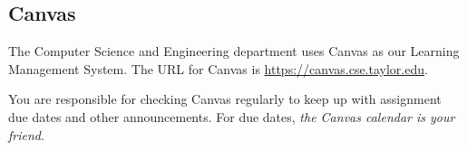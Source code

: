 \subsection{Canvas}

The Computer Science and Engineering department uses Canvas
as our Learning Management System.
The URL for Canvas is \url{https://canvas.cse.taylor.edu}.

You are responsible for checking Canvas regularly
to keep up with assignment due dates and other announcements.
For due dates, \emph{the Canvas calendar is your friend}.
